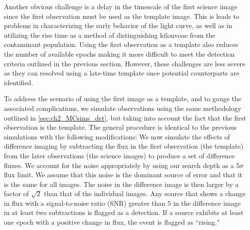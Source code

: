 Another obvious challenge is a delay in the timescale of the first science image since the first observation must be used as the template image. This is leads to problems in characterizing  the early behavior of the light curve, as well as in utilizing the rise time as a method of distinguishing kilonvoae from the contaminant population. Using the first observation as a template also reduces the number of available epochs making it more difficult to meet the detection criteria outlined in the previous section. However, these challenges are less severe as they can resolved using a late-time template once potential counterparts are identified.

To address the scenario of using the first image as a template, and to gauge the associated complications, we simulate observations using the same methodology outlined in \cref{sec:ch2_MCsims_det}, but taking into account the fact that the first observation is the template. The general procedure is identical to the previous simulations with the following modifications: We now simulate the effects of difference imaging by subtracting the flux in the first observation (the template) from the later observations (the science images) to produce a set of difference fluxes. We account for the noise appropriately by using our search depth as a $5\sigma$ flux limit. We assume that this noise is the dominant source of error and that it is the same for all images. The noise in the difference image is then larger by a factor of $\sqrt{2}$ than that of the individual images. Any source that shows a change in flux with a signal-to-noise ratio (SNR) greater than 5 in the difference image in at least two subtractions is flagged as a detection. If a source exhibits at least one epoch with a positive change in flux, the event is flagged as ``rising."

